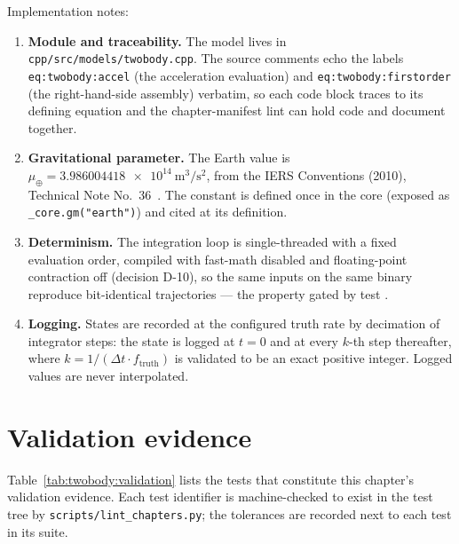 Implementation notes:
\begin{enumerate}
  \item \textbf{Module and traceability.} The model lives in
    \texttt{cpp/src/models/twobody.cpp}. The source comments echo the labels
    \texttt{eq:twobody:accel} (the acceleration evaluation) and
    \texttt{eq:twobody:firstorder} (the right-hand-side assembly) verbatim,
    so each code block traces to its defining equation and the
    chapter-manifest lint can hold code and document together.
  \item \textbf{Gravitational parameter.} The Earth value is
    $\mu_\oplus = \qty{3.986004418e14}{\metre\cubed\per\second\squared}$,
    from the IERS Conventions (2010), Technical Note No.~36~\cite{iers2010}.
    The constant is defined once in the core (exposed as
    \texttt{\_core.gm("earth")}) and cited at its definition.
  \item \textbf{Determinism.} The integration loop is single-threaded with a
    fixed evaluation order, compiled with fast-math disabled and
    floating-point contraction off (decision D-10), so the same inputs on the
    same binary reproduce bit-identical trajectories --- the property gated
    by test .
  \item \textbf{Logging.} States are recorded at the configured truth rate by
    decimation of integrator steps: the state is logged at $t = 0$ and at
    every $k$-th step thereafter, where $k = 1/(\Delta t \cdot
    f_{\text{truth}})$ is validated to be an exact positive integer. Logged
    values are never interpolated.
\end{enumerate}

\section{Validation evidence}
\label{sec:twobody:validation}

Table~\ref{tab:twobody:validation} lists the tests that constitute this
chapter's validation evidence. Each test identifier is machine-checked to
exist in the test tree by \texttt{scripts/lint\_chapters.py}; the tolerances
are recorded next to each test in its suite.

